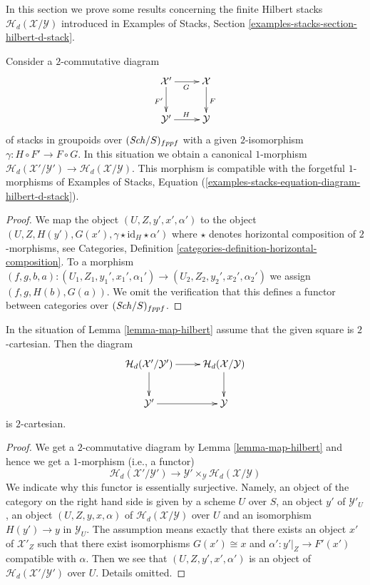 \noindent
In this section we prove some results concerning the finite
Hilbert stacks $\mathcal{H}_d(\mathcal{X}/\mathcal{Y})$
introduced in
Examples of Stacks, Section \ref{examples-stacks-section-hilbert-d-stack}.

\begin{lemma}
\label{lemma-map-hilbert}
Consider a $2$-commutative diagram
$$
\xymatrix{
\mathcal{X}' \ar[r]_G \ar[d]_{F'} & \mathcal{X} \ar[d]^F \\
\mathcal{Y}' \ar[r]^H & \mathcal{Y}
}
$$
of stacks in groupoids over $(\mathit{Sch}/S)_{fppf}$ with a given
$2$-isomorphism $\gamma : H \circ F' \to F \circ G$. In this situation we
obtain a canonical $1$-morphism
$\mathcal{H}_d(\mathcal{X}'/\mathcal{Y}') \to
\mathcal{H}_d(\mathcal{X}/\mathcal{Y})$.
This morphism is compatible with the forgetful $1$-morphisms of
Examples of Stacks,
Equation (\ref{examples-stacks-equation-diagram-hilbert-d-stack}).
\end{lemma}

\begin{proof}
We map the object $(U, Z, y', x', \alpha')$ to the object
$(U, Z, H(y'), G(x'), \gamma \star \text{id}_H \star \alpha')$
where $\star$ denotes horizontal composition of $2$-morphisms, see
Categories, Definition \ref{categories-definition-horizontal-composition}.
To a morphism
$(f, g, b, a) :
(U_1, Z_1, y_1', x_1', \alpha_1') \to (U_2, Z_2, y_2', x_2', \alpha_2')$
we assign
$(f, g, H(b), G(a))$.
We omit the verification that this defines a functor between categories over
$(\mathit{Sch}/S)_{fppf}$.
\end{proof}

\begin{lemma}
\label{lemma-cartesian-map-hilbert}
In the situation of
Lemma \ref{lemma-map-hilbert}
assume that the given square is $2$-cartesian. Then the diagram
$$
\xymatrix{
\mathcal{H}_d(\mathcal{X}'/\mathcal{Y}') \ar[r] \ar[d] &
\mathcal{H}_d(\mathcal{X}/\mathcal{Y}) \ar[d] \\
\mathcal{Y}' \ar[r] &
\mathcal{Y}
}
$$
is $2$-cartesian.
\end{lemma}

\begin{proof}
We get a $2$-commutative diagram by
Lemma \ref{lemma-map-hilbert}
and hence we get a $1$-morphism (i.e., a functor)
$$
\mathcal{H}_d(\mathcal{X}'/\mathcal{Y}')
\longrightarrow
\mathcal{Y}' \times_\mathcal{Y} \mathcal{H}_d(\mathcal{X}/\mathcal{Y})
$$
We indicate why this functor is essentially surjective. Namely, an object
of the category on the right hand side is given by a scheme $U$ over $S$,
an object $y'$ of $\mathcal{Y}'_U$, an object $(U, Z, y, x, \alpha)$
of $\mathcal{H}_d(\mathcal{X}/\mathcal{Y})$ over $U$ and an isomorphism
$H(y') \to y$ in $\mathcal{Y}_U$. The assumption means exactly that
there exists an object $x'$ of $\mathcal{X}'_Z$ such that there exist
isomorphisms $G(x') \cong x$ and $\alpha' : y'|_Z \to F'(x')$ compatible
with $\alpha$. Then we see that $(U, Z, y', x', \alpha')$ is an
object of $\mathcal{H}_d(\mathcal{X}'/\mathcal{Y}')$ over $U$.
Details omitted.
\end{proof}

